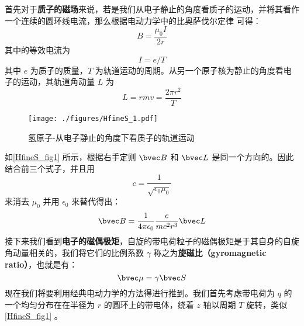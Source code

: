 首先对于\textbf{质子的磁场}来说，若是我们从电子静止的角度看质子的运动，并将其看作一个连续的圆环线电流，那么根据电动力学中的比奥萨伐尔定律 可得：
\begin{equation}
B=\frac{\mu_0I}{2r}
\end{equation}
其中的等效电流为
\begin{equation}
I=e/T
\end{equation}
其中 $e$ 为质子的质量，$T$ 为轨道运动的周期。从另一个原子核为静止的角度看电子的运动，其轨道角动量 $L$ 为
\begin{equation}
L=rmv=\frac{2\pi r^2}{T}
\end{equation}
\begin{figure}[ht]
\centering
\texttt{[image: ./figures/HfineS\_1.pdf]}
\caption{氢原子-从电子静止的角度下看质子的轨道运动} \label{HfineS_fig1}
\end{figure}
如\autoref{HfineS_fig1} 所示，根据右手定则 $\bvec B$ 和 $\bvec L$ 是同一个方向的。因此结合前三个式子，并且用
\begin{equation}
c=\frac{1}{\sqrt{\epsilon_0\mu_0}}
\end{equation}
来消去 $\mu_0$ 并用 $\epsilon_0$ 来替代得出：
\begin{equation}\label{HfineS_eq31}
\bvec B = \frac{1}{4\pi\epsilon_0}\frac{e}{mc^2r^3}\bvec L
\end{equation}
接下来我们看到\textbf{电子的磁偶极矩}，自旋的带电荷粒子的磁偶极矩是于其自身的自旋角动量相关的，我们将它们的比例系数 $\gamma$ 称之为\textbf{旋磁比（gyromagnetic
ratio）}，也就是有：
\begin{equation}
\bvec\mu=\gamma\bvec S
\end{equation}
现在我们将要利用经典电动力学的方法得进行推到。我们首先考虑带电荷为 $q$ 的一个均匀分布在在半径为 $r$ 的圆环上的带电体，绕着 $z$ 轴以周期 $T$ 旋转，类似\autoref{HfineS_fig1} 。

